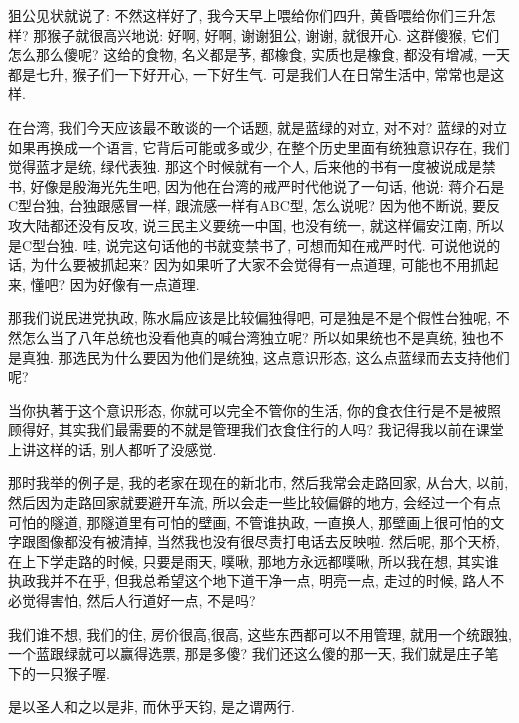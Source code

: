 \documentclass[11pt]{article}
\begin{document}
\vspace{-0.5cm}

狙公见状就说了: 不然这样好了, 我今天早上喂给你们四升, 黄昏喂给你们三升怎样? 那猴子就很高兴地说: 好啊, 好啊, 谢谢狙公, 谢谢, 就很开心. 这群傻猴, 它们怎么那么傻呢? 这给的食物, 名义都是芧, 都橡食, 实质也是橡食, 都没有增减, 一天都是七升, 猴子们一下好开心, 一下好生气. 可是我们人在日常生活中, 常常也是这样.

在台湾, 我们今天应该最不敢谈的一个话题, 就是蓝绿的对立, 对不对? 蓝绿的对立如果再换成一个语言, 它背后可能或多或少, 在整个历史里面有统独意识存在, 我们觉得蓝才是统, 绿代表独. 那这个时候就有一个人, 后来他的书有一度被说成是禁书, 好像是殷海光先生吧, 因为他在台湾的戒严时代他说了一句话, 他说: 蒋介石是C型台独, 台独跟感冒一样, 跟流感一样有ABC型, 怎么说呢? 因为他不断说, 要反攻大陆都还没有反攻, 说三民主义要统一中国, 也没有统一, 就这样偏安江南, 所以是C型台独. 哇, 说完这句话他的书就变禁书了, 可想而知在戒严时代. 可说他说的话, 为什么要被抓起来? 因为如果听了大家不会觉得有一点道理, 可能也不用抓起来, 懂吧? 因为好像有一点道理. 

那我们说民进党执政, 陈水扁应该是比较偏独得吧, 可是独是不是个假性台独呢, 不然怎么当了八年总统也没看他真的喊台湾独立呢? 所以如果统也不是真统, 独也不是真独. 那选民为什么要因为他们是统独, 这点意识形态, 这么点蓝绿而去支持他们呢? 

当你执著于这个意识形态, 你就可以完全不管你的生活, 你的食衣住行是不是被照顾得好, 其实我们最需要的不就是管理我们衣食住行的人吗? 我记得我以前在课堂上讲这样的话, 别人都听了没感觉.

 那时我举的例子是, 我的老家在现在的新北市, 然后我常会走路回家, 从台大, 以前, 然后因为走路回家就要避开车流, 所以会走一些比较偏僻的地方, 会经过一个有点可怕的隧道, 那隧道里有可怕的壁画, 不管谁执政, 一直换人, 那壁画上很可怕的文字跟图像都没有被清掉, 当然我也没有很尽责打电话去反映啦. 然后呢, 那个天桥, 在上下学走路的时候, 只要是雨天, 噗啾, 那地方永远都噗啾, 所以我在想, 其实谁执政我并不在乎, 但我总希望这个地下道干净一点, 明亮一点, 走过的时候, 路人不必觉得害怕, 然后人行道好一点, 不是吗?

我们谁不想, 我们的住, 房价很高,很高, 这些东西都可以不用管理, 就用一个统跟独, 一个蓝跟绿就可以赢得选票, 那是多傻? 我们还这么傻的那一天, 我们就是庄子笔下的一只猴子喔. 




\begin{center}
	{\color{magenta} 是以圣人和之以是非, 而休乎天钧, 是之谓两行.}
\end{center}

\vspace{-0.5cm}
\end{document}
